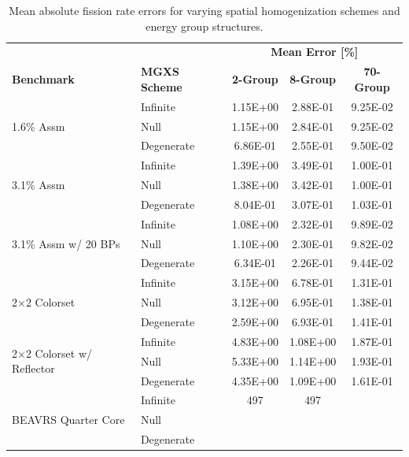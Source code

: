 \begin{table}[h!]
  \centering
  \caption[Mean OpenMOC fission rate errors]{Mean absolute fission rate errors for varying spatial homogenization schemes and energy group structures.}
  \small
  \label{table:chap8-openmoc-mean-fiss-rates}
  \vspace{6pt}
  \begin{tabular}{l l c c c}
  \toprule
  \rowcolor{lightgray}
  & & \multicolumn{3}{c}{\cellcolor{lightgray} \textbf{Mean Error [\%]}} \\
  \multirow{-2}{*}{\cellcolor{lightgray} \bf Benchmark} &
  \multirow{-2}{*}{\cellcolor{lightgray} \bf \ac{MGXS} Scheme} &
  \multicolumn{1}{c}{{\cellcolor{lightgray} \bf 2-Group}} &
  \multicolumn{1}{c}{{\cellcolor{lightgray} \bf 8-Group}} &
  \multicolumn{1}{c}{{\cellcolor{lightgray} \bf 70-Group}} \\
  \midrule
\multirow{3}{*}{\parbox{2.5cm}{1.6\% Assm}} & Infinite & 1.15E+00 & 2.88E-01 & 9.25E-02 \\
& Null & 1.15E+00 & 2.84E-01 & 9.25E-02 \\
& Degenerate & 6.86E-01 & 2.55E-01 & 9.50E-02 \\
  \midrule
\multirow{3}{*}{\parbox{2.5cm}{3.1\% Assm}} & Infinite & 1.39E+00 & 3.49E-01 & 1.00E-01 \\
& Null & 1.38E+00 & 3.42E-01 & 1.00E-01 \\
& Degenerate & 8.04E-01 & 3.07E-01 & 1.03E-01 \\
  \midrule
\multirow{3}{*}{\parbox{2.5cm}{3.1\% Assm w/ 20 BPs}} & Infinite & 1.08E+00 & 2.32E-01 & 9.89E-02 \\
& Null & 1.10E+00 & 2.30E-01 & 9.82E-02 \\
& Degenerate & 6.34E-01 & 2.26E-01 & 9.44E-02 \\
  \midrule
\multirow{3}{*}{\parbox{2.5cm}{2$\times$2 Colorset}} & Infinite & 3.15E+00 & 6.78E-01 & 1.31E-01 \\
& Null & 3.12E+00 & 6.95E-01 & 1.38E-01 \\
& Degenerate & 2.59E+00 & 6.93E-01 & 1.41E-01 \\
  \midrule
\multirow{3}{*}{\parbox{2.5cm}{2$\times$2 Colorset w/ Reflector}} & Infinite & 4.83E+00 & 1.08E+00 & 1.87E-01 \\
& Null & 5.33E+00 & 1.14E+00 & 1.93E-01 \\
& Degenerate & 4.35E+00 & 1.09E+00 & 1.61E-01 \\
  \midrule
  \multirow{3}{*}{\parbox{2cm}{\ac{BEAVRS} Quarter Core}} & Infinite & 497 & 497 & \\
  & Null & & & \\
  & Degenerate & & & \\
  \bottomrule
\end{tabular}
\end{table}

